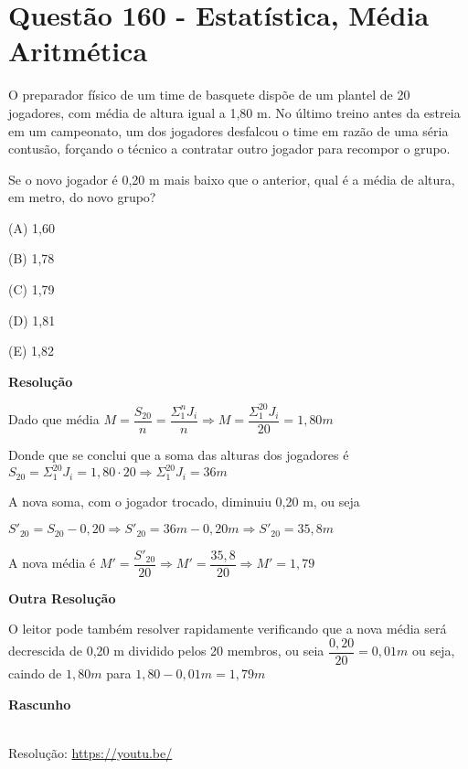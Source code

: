 \section{Questão 160 - Estatística, Média Aritmética}

O preparador físico de um time de basquete dispõe de um plantel de 20 jogadores, com média de altura igual a 1,80 m. No último treino antes da estreia em um campeonato, um dos jogadores desfalcou o time em razão de uma séria contusão, forçando o técnico a contratar outro jogador para recompor o grupo.

Se o novo jogador é 0,20 m mais baixo que o anterior, qual é a média de altura, em metro, do novo grupo?

(A)  1,60

(B)  1,78

(C)  1,79

(D)  1,81

(E)  1,82

\textbf{Resolução}

Dado que média $ M = \dfrac{S_{20}}{n} = \dfrac{\Sigma_{1}^{n} J_{i}}{n} \Rightarrow M = \dfrac{\Sigma_{1}^{20} J_{i}}{20} = 1,80m $

Donde que se conclui que a soma das alturas dos jogadores é $ S_{20} = \Sigma_{1}^{20} J_{i} = 1,80 \cdot 20 \Rightarrow \Sigma_{1}^{20} J_{i} = 36m $

A nova soma, com o jogador trocado, diminuiu 0,20 m, ou seja

$ S'_{20} = S_{20} - 0,20 \Rightarrow S'_{20} = 36m - 0,20m  \Rightarrow S'_{20} = 35,8m $

A nova média é $ M' = \dfrac{S'_{20}}{20} \Rightarrow  M' = \dfrac{35,8}{20} \Rightarrow  M' = 1,79 $

\textbf{Outra Resolução}

O leitor pode também resolver rapidamente verificando que a nova média será decrescida de 0,20 m dividido pelos 20 membros, ou seia $ \dfrac{0,20}{20} = 0,01m $ ou seja, caindo de $ 1,80m $ para $ 1,80 - 0,01m = 1,79m $ 

\textbf{Rascunho}





\begin{center}
    \href{https://youtu.be/}{
    }\\
    Resolução: \url{https://youtu.be/}
\end{center}
